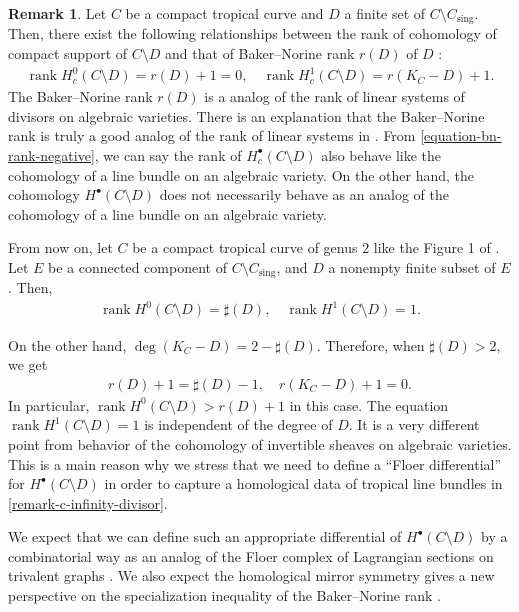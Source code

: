 \documentclass[a4paper,dvipdfmx,reqno,12pt]{amsart}
\theoremstyle{definition}
\newtheorem{remark}[theorem]{Remark}
\newcommand{\opn}[1]{\operatorname{#1}}
\numberwithin{equation}{section}
\begin{document}
\begin{remark}
\label{remark-complement-cohomology}
Let $C$ be a compact tropical curve and $D$
a finite set of $C\setminus C_{\mathrm{sing}}$.
Then, there exist the following relationships
between the rank of cohomology of compact support
of $C\setminus D$ and that of Baker--Norine rank
$r(D)$ of $D$ \cite[Definition 1.12]{MR2377750}: 
\begin{align}
\label{equation-bn-rank-negative}
\opn{rank} H_c^{0}(C\setminus D)=r(D)+1=0, \quad
\opn{rank} H_c^{1}(C\setminus D)=r(K_C-D)+1.
\end{align}
The Baker--Norine rank $r(D)$ is a analog of 
the rank of linear systems of divisors on
algebraic varieties.
There is an explanation that the Baker--Norine
rank is truly a good analog of the rank of linear systems
in \cite{MR2448666}.
From \eqref{equation-bn-rank-negative},
we can say the rank of $H_c^{\bullet}(C\setminus D)$
also behave like the cohomology of a line bundle on
an algebraic variety.
On the other hand, the cohomology
$H^{\bullet}(C\setminus D)$ does not necessarily behave
as an analog of the cohomology of a line bundle on
an algebraic variety.

From now on, let $C$ be a compact tropical curve
of genus $2$ like the Figure 1 of
\cite{MR2457739}.
Let $E$ be a connected component of  
 $C\setminus C_{\mathrm{sing}}$, and
$D$ a nonempty finite subset of $E$. 
Then,
\begin{align}
\label{equation-cohomology-behaviour}
\opn{rank} H^{0}(C\setminus D)=\sharp(D), \quad
\opn{rank} H^{1}(C\setminus D)=1.
\end{align}

On the other hand, $\opn{deg}(K_C-D)=2-\sharp (D)$.
Therefore, when $\sharp (D)>2$, we get
\begin{align}
\label{equation-rank-behaviour}
r(D)+1=\sharp(D)-1,\quad r(K_C-D)+1=0.
\end{align}
In particular, 
$\opn{rank} H^{0}(C\setminus D)>r(D)+1$ in this case.
The equation $\opn{rank} H^{1}(C\setminus D)=1$ is
independent of the degree of $D$.
It is a very different point from behavior of 
the cohomology of invertible sheaves on algebraic varieties.
This is a main reason why we stress 
that we need to define a ``Floer differential'' for 
$H^{\bullet}(C\setminus D)$ in order to capture a
homological data of tropical line bundles 
in \cref{remark-c-infinity-divisor}.

We expect that we can define such an appropriate
differential of $H^{\bullet}(C\setminus D)$
by a combinatorial way as an analog of
the Floer complex of Lagrangian sections on 
trivalent graphs
\cite{auroux2022lagrangian}.
We also expect the homological mirror symmetry
gives a new perspective on the specialization
inequality of the Baker--Norine rank 
\cite[Lemma 2.8]{MR2448666}. 
\end{remark}
\end{document}
